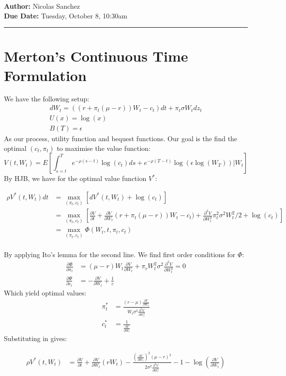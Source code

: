 \documentclass{article}[12pt]
\newcommand{\headings}[4]{\noindent {\bf Assignment 6 CME241} \hfill {{\bf Author:} Nicolas Sanchez} \\
{} \hfill {{\bf Due Date:} #2} \\

\rule[0.1in]{\textwidth}{0.025in}
}
\begin{document}
\headings{\#1}{Tuesday, October 8, 10:30am}\section{} 



\section{Merton's Continuous Time Formulation}
We have the following setup:
\begin{align*}
dW_t = ((r + \pi_t(\mu-r))W_t - c_t)dt + \pi_t\sigma W_t dz_t\\
U(x) = \log(x)\\
B(T) = \epsilon
\end{align*}
As our process, utility function and bequest functions. Our goal is the find the optimal $(c_t,\pi_t)$ to maximise the value function:
$$ V(t,W_t) =  E[\int_{s = t}^T e^{-\rho(s-t)}\log(c_t)ds+ e^{-\rho(T-t)}\log(\epsilon\log(W_T)) | W_t]$$
By HJB, we have for the optimal value function $V^*$:

\begin{align*}
\rho V^*(t,W_t) dt &= \max_{(\pi_t, c_t)}[dV^*(t,W_t) + \log(c_t)]\\
&= \max_{(\pi_t, c_t)}[\frac{\partial V}{\partial t} + \frac{\partial V}{\partial W_t}(r + \pi_t(\mu-r))W_t - c_t)+ \frac{\partial^2 V}{\partial W_t^2}\pi_t^2\sigma^2W_t^2/2 +\log(c_t)]\\
&= \max_{(\pi_t, c_t)}\Phi(W_t, t, \pi_t, c_t)\\
\end{align*}

By applying Ito's lemma for the second line. We find first order conditions for $\Phi$:
\begin{align*}
\frac{\partial \Phi}{\partial \pi_t} &= (\mu-r)W_t\frac{\partial V}{\partial W_t} + \pi_rW_t^2\sigma^2 \frac{\partial^2 V}{\partial W_t^2} = 0\\
\frac{\partial \Phi}{\partial c_t} &= -\frac{\partial V}{\partial W_t} + \frac{1}{c}
\end{align*}
Which yield optimal values:
\begin{align*}
\pi_t^*&= \frac{(r-\mu)\frac{\partial V}{\partial W_t}}{W_t\sigma^2\frac{\partial^2 V}{\partial W_t^2}} \\
c_t^* &= \frac{1}{\frac{\partial V}{\partial W_t}}
\end{align*}
Substituting in gives:


\begin{align*}
\rho V^*(t,W_t)  &= \frac{\partial V}{\partial t} + \frac{\partial V}{\partial W_t}(rW_t)-\frac{(\frac{\partial V}{\partial W_t})^2(\mu-r)^2}{2\sigma^2\frac{\partial^2 V}{\partial W_t^2}} - 1-\log(\frac{\partial V}{\partial W_t})
\end{align*}
\end{document}
